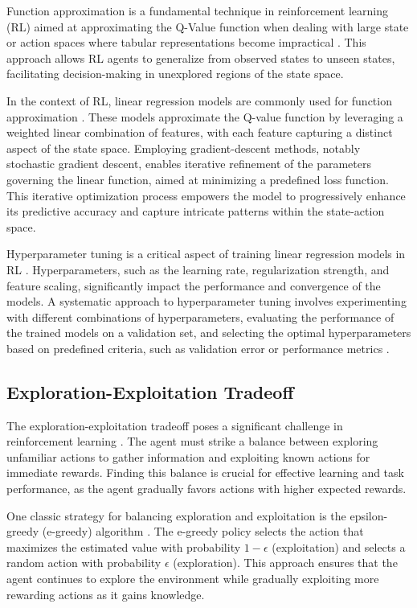 Function approximation is a fundamental technique in reinforcement learning (RL) aimed at approximating the Q-Value function when dealing with large state or action spaces where tabular representations become impractical \cite{russel2020ai}. This approach allows RL agents to generalize from observed states to unseen states, facilitating decision-making in unexplored regions of the state space.

In the context of RL, linear regression models are commonly used for function approximation \cite{sutton2018reinforcement}.  These models approximate the Q-value function by leveraging a weighted linear combination of features, with each feature capturing a distinct aspect of the state space. Employing gradient-descent methods, notably stochastic gradient descent, enables iterative refinement of the parameters governing the linear function, aimed at minimizing a predefined loss function. This iterative optimization process empowers the model to progressively enhance its predictive accuracy and capture intricate patterns within the state-action space.

Hyperparameter tuning is a critical aspect of training linear regression models in RL \cite{bergstra2012random}. Hyperparameters, such as the learning rate, regularization strength, and feature scaling, significantly impact the performance and convergence of the models. A systematic approach to hyperparameter tuning involves experimenting with different combinations of hyperparameters, evaluating the performance of the trained models on a validation set, and selecting the optimal hyperparameters based on predefined criteria, such as validation error or performance metrics \cite{russel2020ai}.

\subsection{Exploration-Exploitation Tradeoff}

The exploration-exploitation tradeoff poses a significant challenge in reinforcement learning \cite{sutton2018reinforcement}. The agent must strike a balance between exploring unfamiliar actions to gather information and exploiting known actions for immediate rewards. Finding this balance is crucial for effective learning and task performance, as the agent gradually favors actions with higher expected rewards.

One classic strategy for balancing exploration and exploitation is the epsilon-greedy (e-greedy) algorithm \cite{sutton2018reinforcement}. The e-greedy policy selects the action that maximizes the estimated value with probability $1 - \epsilon$ (exploitation) and selects a random action with probability $\epsilon$ (exploration). This approach ensures that the agent continues to explore the environment while gradually exploiting more rewarding actions as it gains knowledge.

